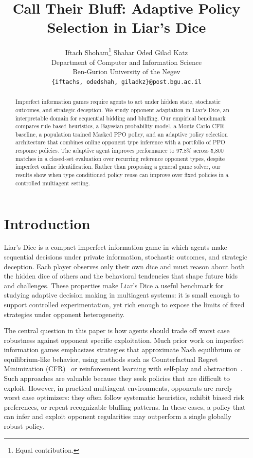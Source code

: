 \documentclass{article}
\title{Call Their Bluff: Adaptive Policy Selection in Liar's Dice}
\author{%
  Iftach Shoham\thanks{Equal contribution.} \quad
  Shahar Oded\footnotemark[1] \quad
  Gilad Katz \\
  Department of Computer and Information Science \\
  Ben-Gurion University of the Negev \\
  \texttt{\{iftachs, odedshah, giladkz\}@post.bgu.ac.il}
}
\begin{document}
\maketitle

\begin{abstract}
Imperfect information games require agents to act under hidden state, stochastic outcomes, and strategic deception. We study opponent adaptation in Liar's Dice, an interpretable domain for sequential bidding and bluffing. Our empirical benchmark compares rule based heuristics, a Bayesian probability model, a Monte Carlo CFR baseline, a population trained Masked PPO policy, and an adaptive policy selection architecture that combines online opponent type inference with a portfolio of PPO response policies. The adaptive agent improves performance to 97.8\% across 5,800 matches in a closed-set evaluation over recurring reference opponent types, despite imperfect online identification. Rather than proposing a general game solver, our results show when type conditioned policy reuse can improve over fixed policies in a controlled multiagent setting.
\end{abstract}




\section{Introduction}

Liar’s Dice is a compact imperfect information game in which agents make sequential decisions under private information, stochastic outcomes, and strategic deception. Each player observes only their own dice and must reason about both the hidden dice of others and the behavioral tendencies that shape future bids and challenges. These properties make Liar’s Dice a useful benchmark for studying adaptive decision making in multiagent systems: it is small enough to support controlled experimentation, yet rich enough to expose the limits of fixed strategies under opponent heterogeneity.

The central question in this paper is how agents should trade off worst case robustness against opponent specific exploitation. Much prior work on imperfect information games emphasizes strategies that approximate Nash equilibrium or equilibrium-like behavior, using methods such as Counterfactual Regret Minimization (CFR)~\cite{cfr} or reinforcement learning with self-play and abstraction~\cite{heinrich2016deep}. Such approaches are valuable because they seek policies that are difficult to exploit. However, in practical multiagent environments, opponents are rarely worst case optimizers: they often follow systematic heuristics, exhibit biased risk preferences, or repeat recognizable bluffing patterns. In these cases, a policy that can infer and exploit opponent regularities may outperform a single globally robust policy.
\end{document}
